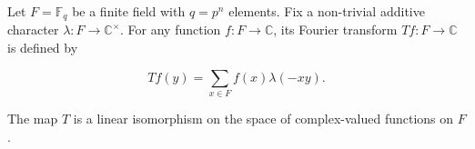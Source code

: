 Let $F = \mathbb{F}_q$ be a finite field with $q = p^n$ elements. Fix a non-trivial additive character $\lambda: F \to \mathbb{C}^\times$. For any function $f: F \to \mathbb{C}$, its Fourier transform $Tf: F \to \mathbb{C}$ is defined by

$$Tf(y) = \sum_{x \in F} f(x) \lambda(-xy).$$

The map $T$ is a linear isomorphism on the space of complex-valued functions on $F$.
